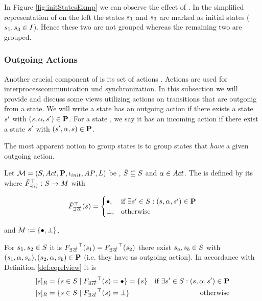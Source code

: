 \documentclass[preview]{standalone}
\begin{document}
In Figure \ref{fig:initStatesExmp} we can observe the effect of \viewinitstates. In the simplified representation of \achgphN on the left the states ${s}_1$ and ${s}_3$ are marked as initial states (${s}_1, {s}_3 \in {I}$). Hence these two are not grouped whereas the remaining two are grouped.


\subsubsection{Outgoing Actions}
Another crucial component of \achgphN is its set of actions \actions. Actions are used for interprocesscommunication und synchronization. In this subsection we will provide and discuss some views utilizing actions on transitions that are outgonig from a state. 
We will write a state \state has an outgoing action \action if there exists a state ${s}'$ with $({s}, {\alpha}, {s}') \in {\ensuremath{{\textbf{P}}}}$. For a state \state, we say it has an incoming action \action if there exist a state ${s}'$ with $({s}', {\alpha}, {s}) \in {\ensuremath{{\textbf{P}}}}$.

The most apparent notion to group states is to group states that \emph{have} a given outgoing action.

\begin{definition}
	Let ${{{\mathcal{M}}}} = {{({S}, {Act}, {\textbf{P}}, {\iota_{init}}, {AP}, {L})}}$ be \achgphN, ${\tilde{{S}}} \subseteq {S}$ and ${\alpha} \in {Act}$. The \viewN \viewhasoutaction is defined by its \grpfctN \gfcthasoutaction where ${{\tilde{F}_{{\exists{\overrightarrow{\ensuremath{{\alpha}}}}}}}^{\top}} : {S} \to {\ensuremath{{M}}}$ with

	\[
	{{\tilde{F}_{{\exists{\overrightarrow{\ensuremath{{\alpha}}}}}}}^{\top}}({s}) =
	\begin{cases}
			{\bullet},				& \text{if } \exists {s}' \in {S}: ({s}, {\alpha}, {s}') \in {\ensuremath{{\textbf{P}}}} \\
			{\bot},          	& \text{otherwise}
		\end{cases}
	\]
	
	and ${{M}} := {\{{\bullet}, {\bot}\}}$. %
\end{definition}


For ${s}_1,{s}_2 \in {S}$ it is ${{F_{{\exists{\overrightarrow{\ensuremath{{\alpha}}}}}}}^{\top}}({s}_1) = {{F_{{\exists{\overrightarrow{\ensuremath{{\alpha}}}}}}}^{\top}}({s}_2)$ \iffN 
there exist ${s}_{a},{s}_{b} \in {S}$ with 
$({s}_1, {\alpha}, {s}_{a}), ({s}_2, {\alpha}, {s}_{b}) \in {\ensuremath{{\textbf{P}}}}$ (i.e. they have \action as outgoing action). 
In accordance with Definition \ref{def:eqrelview} it is
\begin{align*}
	\eqclassv &= \{\state \in \states \mid \gfcthasoutaction(\state) = \remelem\} = \{s\} &\text{if }\exists\state' \in \states : (\state, \action, \state') \in \trans \\
	\eqclassv &= \{\state \in \states \mid \gfcthasoutaction(\state) = \notppty\}  &\text{ otherwise}
\end{align*}
\end{document}
